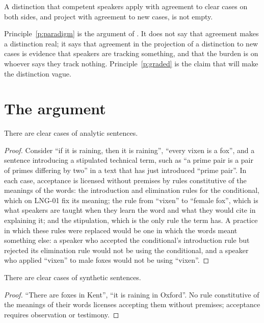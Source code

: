 \documentclass{situationist-preprint}
\begin{document}
\begin{principle}[Paradigms]\label{p:paradigm}
A distinction that competent speakers apply with agreement to clear cases on both sides, and project with agreement to new cases, is not empty.
\end{principle}

Principle~\ref{p:paradigm} is the argument of \citet{GriceStrawson1956}. It does not say that agreement makes a distinction real; it says that agreement in the projection of a distinction to new cases is evidence that speakers are tracking something, and that the burden is on whoever says they track nothing. Principle~\ref{p:graded} is the claim that will make the distinction vague.

\section{The argument}

\begin{proposition}\label{p:pos}
There are clear cases of analytic sentences.
\end{proposition}

\begin{proof}
Consider \enquote{if it is raining, then it is raining}, \enquote{every vixen is a fox}, and a sentence introducing a stipulated technical term, such as \enquote{a prime pair is a pair of primes differing by two} in a text that has just introduced \enquote{prime pair}. In each case, acceptance is licensed without premises by rules constitutive of the meanings of the words: the introduction and elimination rules for the conditional, which on LNG-01 fix its meaning; the rule from \enquote{vixen} to \enquote{female fox}, which is what speakers are taught when they learn the word and what they would cite in explaining it; and the stipulation, which is the only rule the term has. A practice in which these rules were replaced would be one in which the words meant something else: a speaker who accepted the conditional's introduction rule but rejected its elimination rule would not be using the conditional, and a speaker who applied \enquote{vixen} to male foxes would not be using \enquote{vixen}.
\end{proof}

\begin{proposition}\label{p:neg}
There are clear cases of synthetic sentences.
\end{proposition}

\begin{proof}
\enquote{There are foxes in Kent}, \enquote{it is raining in Oxford}. No rule constitutive of the meanings of their words licenses accepting them without premises; acceptance requires observation or testimony.
\end{proof}
\end{document}
